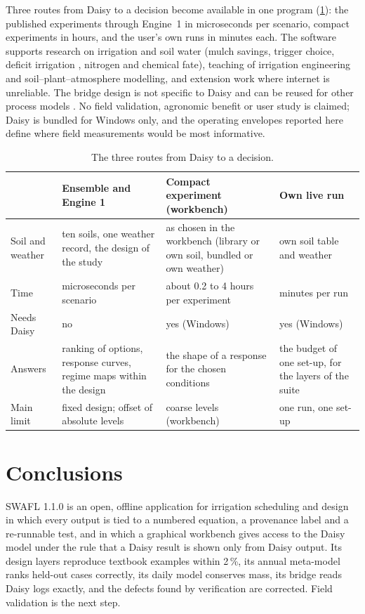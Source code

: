 \documentclass[preprint,12pt]{elsarticle}
\begin{document}
Three routes from Daisy to a decision become available in one program (\cref{tab:routes}): the published experiments through Engine~1 in microseconds per scenario, compact experiments in hours, and the user's own runs in minutes each. The software supports research on irrigation and soil water (mulch savings, trigger choice, deficit irrigation \cite{Fereres2007,Geerts2009}, nitrogen and chemical fate), teaching of irrigation engineering and soil--plant--atmosphere modelling, and extension work where internet is unreliable. The bridge design is not specific to Daisy and can be reused for other process models \cite{Simunek2016,Keating2003}. No field validation, agronomic benefit or user study is claimed; Daisy is bundled for Windows only, and the operating envelopes reported here define where field measurements would be most informative.

\begin{table}[!htbp]\centering\small
\caption{The three routes from Daisy to a decision.}\label{tab:routes}
\begin{tabularx}{\textwidth}{>{\raggedright\arraybackslash}p{3.0cm}XXX}
\toprule & Ensemble and Engine 1 & Compact experiment (workbench) & Own live run\\\midrule
Soil and weather & ten soils, one weather record, the design of the study & as chosen in the workbench (library or own soil, bundled or own weather) & own soil table and weather\\
Time & microseconds per scenario & about 0.2 to 4 hours per experiment & minutes per run\\
Needs Daisy & no & yes (Windows) & yes (Windows)\\
Answers & ranking of options, response curves, regime maps within the design & the shape of a response for the chosen conditions & the budget of one set-up, for the layers of the suite\\
Main limit & fixed design; offset of absolute levels & coarse levels (workbench) & one run, one set-up\\\bottomrule
\end{tabularx}
\end{table}

\section{Conclusions}
SWAFL 1.1.0 is an open, offline application for irrigation scheduling and design in which every output is tied to a numbered equation, a provenance label and a re-runnable test, and in which a graphical workbench gives access to the Daisy model under the rule that a Daisy result is shown only from Daisy output. Its design layers reproduce textbook examples within 2\,\%, its annual meta-model ranks held-out cases correctly, its daily model conserves mass, its bridge reads Daisy logs exactly, and the defects found by verification are corrected. Field validation is the next step.
\end{document}
